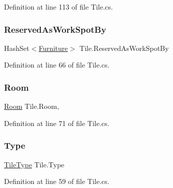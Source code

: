 Definition at line 113 of file Tile.\+cs.

\mbox{\label{class_tile_af57365d59cb055a342e5e56f237aaf8e}} 
\subsubsection{\texorpdfstring{Reserved\+As\+Work\+Spot\+By}{ReservedAsWorkSpotBy}}
{\footnotesize\ttfamily Hash\+Set$<$\hyperlink{class_furniture}{Furniture}$>$ Tile.\+Reserved\+As\+Work\+Spot\+By\hspace{0.3cm}{\ttfamily [get]}}



Definition at line 66 of file Tile.\+cs.

\mbox{\label{class_tile_ac5e22a506cb6c40aa6e73ad091ef89bf}} 
\subsubsection{\texorpdfstring{Room}{Room}}
{\footnotesize\ttfamily \hyperlink{class_project_porcupine_1_1_rooms_1_1_room}{Room} Tile.\+Room\hspace{0.3cm}{\ttfamily [get]}, {\ttfamily [set]}}



Definition at line 71 of file Tile.\+cs.

\mbox{\label{class_tile_ae81a2b6cfecac7ae9e0d246e97dad91e}} 
\subsubsection{\texorpdfstring{Type}{Type}}
{\footnotesize\ttfamily \hyperlink{class_tile_type}{Tile\+Type} Tile.\+Type\hspace{0.3cm}{\ttfamily [get]}}



Definition at line 59 of file Tile.\+cs.

\mbox{\label{class_tile_a2073539dbc53f09e81b688dacfc4efb7}} 
